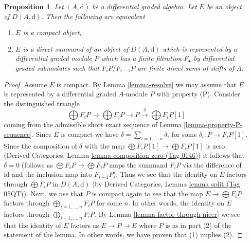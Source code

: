 \documentclass{amsart}
\theoremstyle{plain}
\newtheorem{proposition}[subsection]{Proposition}
\theoremstyle{definition}
\theoremstyle{remark}
\numberwithin{equation}{subsection}
\begin{document}
\begin{proposition}
\label{proposition-compact}
Let $(A, \text{d})$ be a differential graded algebra. Let $E$ be an
object of $D(A, \text{d})$. Then the following are equivalent
\begin{enumerate}
\item $E$ is a compact object,
\item $E$ is a direct summand of an object of $D(A, \text{d})$
which is represented by a differential graded module $P$ which
has a finite filtration $F_\bullet$ by differential graded submodules
such that $F_iP/F_{i - 1}P$ are finite direct sums of shifts of $A$.
\end{enumerate}
\end{proposition}

\begin{proof}
Assume $E$ is compact. By Lemma \ref{lemma-resolve} we may assume that $E$
is represented by a differential graded $A$-module $P$ with property (P).
Consider the distinguished triangle
$$
\bigoplus F_iP \to \bigoplus F_iP \to P
\xrightarrow{\delta} \bigoplus F_iP[1]
$$
coming from the admissible short exact sequence of
Lemma \ref{lemma-property-P-sequence}. Since $E$ is compact we have
$\delta = \sum_{i = 1, \ldots, n} \delta_i$ for some
$\delta_i : P \to F_iP[1]$. Since the composition of $\delta$
with the map $\bigoplus F_iP[1] \to \bigoplus F_iP[1]$ is zero
(Derived Categories, Lemma \href{https://stacks.math.columbia.edu/tag/0146}{lemma composition zero (Tag 0146)})
it follows that $\delta = 0$ (follows as $\bigoplus F_iP \to \bigoplus F_iP$
maps the summand $F_iP$ via the difference of $\text{id}$ and the inclusion
map into $F_{i - 1}P$).
Thus we see that the identity on $E$ factors through
$\bigoplus F_iP$ in $D(A, \text{d})$ (by
Derived Categories, Lemma \href{https://stacks.math.columbia.edu/tag/05QT}{lemma split (Tag 05QT)}).
Next, we use that $P$ is compact again to see that the map
$E \to \bigoplus F_iP$ factors through $\bigoplus_{i = 1, \ldots, n} F_iP$
for some $n$. In other words, the identity on $E$ factors through
$\bigoplus_{i = 1, \ldots, n} F_iP$. By
Lemma \ref{lemma-factor-through-nicer}
we see that the identity of $E$ factors as $E \to P \to E$
where $P$ is as in part (2) of the statement of the lemma.
In other words, we have proven that (1) implies (2).


\end{proof}
\end{document}
